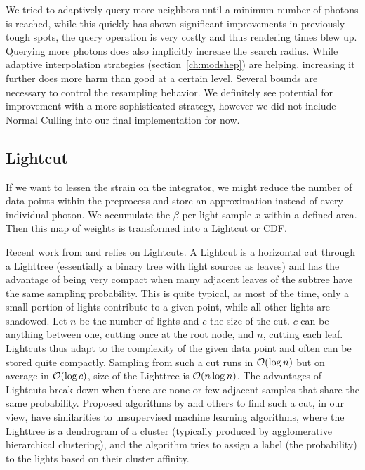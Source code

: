 We tried to adaptively query more neighbors until a minimum number of photons is reached, while this quickly has shown significant improvements in previously tough spots, the query operation is very costly and thus rendering times blew up. Querying more photons does also implicitly increase the search radius. While adaptive interpolation strategies (section~\ref{ch:modshep}) are helping, increasing it further does more harm than good at a certain level. Several bounds are necessary to control the resampling behavior. We definitely see potential for improvement with a more sophisticated strategy, however we did not include Normal Culling into our final implementation for now.

\subsection{Lightcut}
\label{sec:lightcutd}
If we want to lessen the strain on the integrator, we might reduce the number of data points within the preprocess and store an approximation instead of every individual photon. We accumulate the $\beta$ per light sample $x$ within a defined area. Then this map of weights is transformed into a Lightcut or CDF.

Recent work from \textcite{Estevez} and \textcite{Vevoda} relies on Lightcuts. A Lightcut is a horizontal cut through a Lighttree (essentially a binary tree with light sources as leaves) and has the advantage of being very compact when many adjacent leaves of the subtree have the same sampling probability. This is quite typical, as most of the time, only a small portion of lights contribute to a given point, while all other lights are shadowed. Let $n$ be the number of lights and $c$ the size of the cut. $c$ can be anything between one, cutting once at the root node, and $n$, cutting each leaf. Lightcuts thus adapt to the complexity of the given data point and often can be stored quite compactly. Sampling from such a cut runs in $\mathcal{O}(\log{n})$ but on average in $\mathcal{O}(\log{c})$, size of the Lighttree is $\mathcal{O}(n\log{n})$. The advantages of Lightcuts break down when there are none or few adjacent samples that share the same probability. Proposed algorithms by \textcite{Estevez} and others to find such a cut, in our view, have similarities to unsupervised machine learning algorithms, where the Lighttree is a dendrogram of a cluster (typically produced by agglomerative hierarchical clustering), and the algorithm tries to assign a label (the probability) to the lights based on their cluster affinity. 

